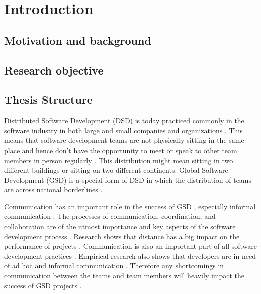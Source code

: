 \chapter{Introduction}

\section{Motivation and background}

\section{Research objective}

\section{Thesis Structure}





Distributed Software Development (DSD) is today practiced commonly in the software industry in both large and small companies and organizations \citep{shrivastava2010distributed}. This means that software development teams are not physically sitting in the same place and hence don’t have the opportunity to meet or speak to other team members in person regularly \citep{layman2006essential}. This distribution might mean sitting in two different buildings or sitting on two different continents. Global Software Development (GSD) is a special form of DSD in which the distribution of teams are across national borderlines \citep{sahay2003global}. 

Communication has an important role in the success of GSD \citep{carmel2001tactical,french1998study}, especially informal communication \citep{herbsleb2003empirical}. The processes of communication, coordination, and collaboration are of the utmost importance and key aspects of the software development process \citep{colomo2014agile}. Research shows that distance has a big impact on the performance of projects \citep{damian2003global,herbsleb2001global}. Communication is also an important part of all software development practices \citep{layman2006essential}. Empirical research also shows that developers are in need of ad hoc and informal communication \citep{grinter1998recomposition,kraut1995coordination}. Therefore any shortcomings in communication between the teams and team members will heavily impact the success of GSD projects \citep{layman2006essential}.

